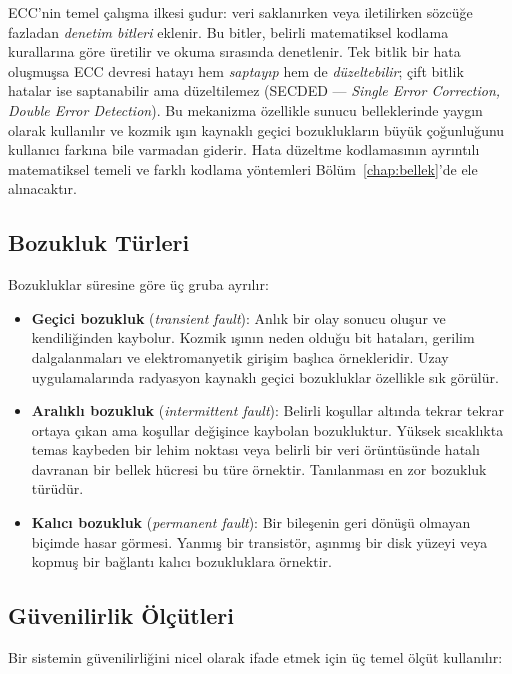 ECC'nin temel çalışma ilkesi şudur: veri saklanırken veya iletilirken sözcüğe fazladan \emph{denetim bitleri} eklenir. Bu bitler, belirli matematiksel kodlama kurallarına göre üretilir ve okuma sırasında denetlenir. Tek bitlik bir hata oluşmuşsa ECC devresi hatayı hem \emph{saptayıp} hem de \emph{düzeltebilir}; çift bitlik hatalar ise saptanabilir ama düzeltilemez (SECDED --- \emph{Single Error Correction, Double Error Detection}). Bu mekanizma özellikle sunucu belleklerinde yaygın olarak kullanılır ve kozmik ışın kaynaklı geçici bozuklukların büyük çoğunluğunu kullanıcı farkına bile varmadan giderir. Hata düzeltme kodlamasının ayrıntılı matematiksel temeli ve farklı kodlama yöntemleri Bölüm~\ref{chap:bellek}'de ele alınacaktır.

\subsection{Bozukluk Türleri}
\label{subsec:bozukluk-turleri}

Bozukluklar süresine göre üç gruba ayrılır:
\begin{itemize}
    \item \textbf{Geçici bozukluk} (\emph{transient fault}): Anlık bir olay sonucu oluşur ve kendiliğinden kaybolur. Kozmik ışının neden olduğu bit hataları, gerilim dalgalanmaları ve elektromanyetik girişim başlıca örnekleridir. Uzay uygulamalarında radyasyon kaynaklı geçici bozukluklar özellikle sık görülür.
    \item \textbf{Aralıklı bozukluk} (\emph{intermittent fault}): Belirli koşullar altında tekrar tekrar ortaya çıkan ama koşullar değişince kaybolan bozukluktur. Yüksek sıcaklıkta temas kaybeden bir lehim noktası veya belirli bir veri örüntüsünde hatalı davranan bir bellek hücresi bu türe örnektir. Tanılanması en zor bozukluk türüdür.
    \item \textbf{Kalıcı bozukluk} (\emph{permanent fault}): Bir bileşenin geri dönüşü olmayan biçimde hasar görmesi. Yanmış bir transistör, aşınmış bir disk yüzeyi veya kopmuş bir bağlantı kalıcı bozukluklara örnektir.
\end{itemize}

\subsection{Güvenilirlik Ölçütleri}
\label{subsec:guvenilirlik-olcutleri}

Bir sistemin güvenilirliğini nicel olarak ifade etmek için üç temel ölçüt kullanılır:

